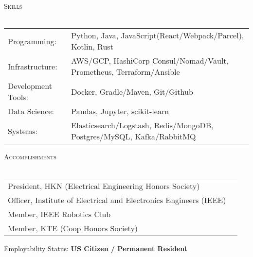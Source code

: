 \documentclass[a4paper]{article}
\newcommand{\lineunder} {
    \vspace*{-8pt} \\
    \hspace*{-18pt} \hrulefill \\
}
\newcommand{\header} [1] {
    {\hspace*{-18pt}\vspace*{6pt} \textsc{#1}}
    \vspace*{-6pt} \lineunder
}
\begin{document}
\header{Skills}
\begin{tabular}{ l l }
    Programming: & Python, Java, JavaScript(React/Webpack/Parcel), Kotlin, Rust\\
    Infrastructure: & AWS/GCP, HashiCorp Consul/Nomad/Vault, Prometheus, Terraform/Ansible\\
    Development Tools: & Docker, Gradle/Maven, Git/Github\\
    Data Science: & Pandas, Jupyter, scikit-learn \\
    Systems: & Elasticsearch/Logstash, Redis/MongoDB, Postgres/MySQL, Kafka/RabbitMQ\\
\end{tabular}
\vspace{2mm}

\header{Accomplishments}
\begin{tabular}{ l l }
    President, HKN (Electrical Engineering Honors Society)\\
    Officer, Institute of Electrical and Electronics Engineers (IEEE)\\
    Member, IEEE Robotics Club\\
    Member, KTE (Coop Honors Society)\\
\end{tabular}
\vspace{2mm}

Employability Status: \textbf{US Citizen / Permanent Resident}\\

\ 
\end{document}
